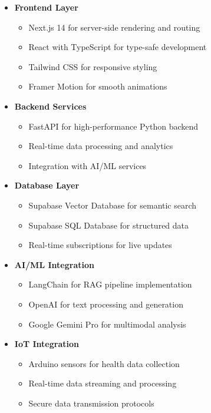 \begin{itemize}
    \item \textbf{Frontend Layer}
    \begin{itemize}
        \item Next.js 14 for server-side rendering and routing
        \item React with TypeScript for type-safe development
        \item Tailwind CSS for responsive styling
        \item Framer Motion for smooth animations
    \end{itemize}

    \item \textbf{Backend Services}
    \begin{itemize}
        \item FastAPI for high-performance Python backend
        \item Real-time data processing and analytics
        \item Integration with AI/ML services
    \end{itemize}

    \item \textbf{Database Layer}
    \begin{itemize}
        \item Supabase Vector Database for semantic search
        \item Supabase SQL Database for structured data
        \item Real-time subscriptions for live updates
    \end{itemize}

    \item \textbf{AI/ML Integration}
    \begin{itemize}
        \item LangChain for RAG pipeline implementation
        \item OpenAI for text processing and generation
        \item Google Gemini Pro for multimodal analysis
    \end{itemize}

    \item \textbf{IoT Integration}
    \begin{itemize}
        \item Arduino sensors for health data collection
        \item Real-time data streaming and processing
        \item Secure data transmission protocols
    \end{itemize}
\end{itemize}

